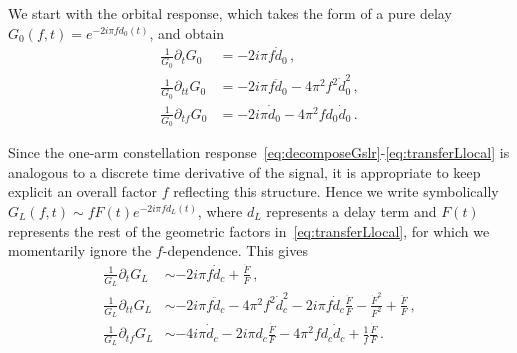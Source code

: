 \documentclass[aps,showpacs,twocolumn,
prd,superscriptaddress,nofootinbib]{revtex4-1}
\begin{document}
We start with the orbital response, which takes the form of a pure delay $G_{0}(f, t) = e^{-2 i \pi f d_{0}(t)}$, and obtain
\begin{subequations}
\begin{align}
	\frac{1}{G_{0}} \partial_{t} G_{0} &= -2i\pi f \dot{d}_{0}\,,\\
	\frac{1}{G_{0}} \partial_{tt} G_{0} &= -2i\pi f \ddot{d}_{0} - 4\pi^{2} f^{2} \dot{d}_{0}^{2} \,,\\
	\frac{1}{G_{0}} \partial_{tf} G_{0} &= -2 i \pi \dot{d}_{0} - 4\pi^{2} f d_{0} \dot{d}_{0} \,.
\end{align}
\end{subequations}

Since the one-arm constellation response~\eqref{eq:decomposeGslr}-\eqref{eq:transferLlocal} is analogous to a discrete time derivative of the signal, it is appropriate to keep explicit an overall factor $f$ reflecting this structure. Hence we write symbolically $G_{L}(f,t) \sim f F(t) e^{-2i \pi f d_{L}(t)}$, where $d_{L}$ represents a delay term and $F(t)$ represents the rest of the geometric factors in~\eqref{eq:transferLlocal}, for which we momentarily ignore the $f$-dependence. This gives
\begin{subequations}
\begin{align}
	\frac{1}{G_{L}} \partial_{t} G_{L} &\sim -2i\pi f \dot{d}_{c} + \frac{\dot{F}}{F}\,,\\
	\frac{1}{G_{L}} \partial_{tt} G_{L} &\sim -2i\pi f \ddot{d}_{c} - 4\pi^{2} f^{2} \dot{d}_{c}^{2} - 2i\pi f \dot{d}_{c} \frac{\dot{F}}{F} - \frac{\dot{F}^{2}}{F^{2}} + \frac{\ddot{F}}{F} \,,\\
	\frac{1}{G_{L}} \partial_{tf} G_{L} &\sim -4 i \pi \dot{d}_{c} - 2i\pi d_{c} \frac{\dot{F}}{F} - 4\pi^{2} f d_{c} \dot{d}_{c} + \frac{1}{f}\frac{\dot{F}}{F}\,.
\end{align}
\end{subequations}
\end{document}
